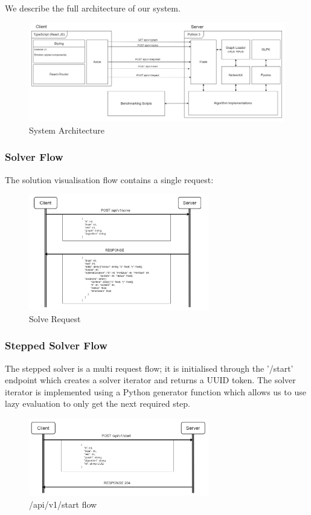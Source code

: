 We describe the full architecture of our system.

\begin{figure}[H]
    \centering
    \includegraphics[width=\textwidth]{images/system_architecture.png}
    \caption{System Architecture}
    \label{fig:system_architecture}
\end{figure}

\subsubsection{Solver Flow}
The solution visualisation flow contains a single request:
\begin{figure}[H]
    \centering
    \includegraphics[width=0.7\textwidth]{images/solver_ui/post_solve_flow.png}
    \caption{Solve Request}
    \label{fig:solve_request}
\end{figure}

\subsubsection{Stepped Solver Flow}
The stepped solver is a multi request flow; it is initialised through the '/start' endpoint which creates a solver iterator and returns a UUID token. The solver iterator is implemented using a Python generator function which allows us to use lazy evaluation to only get the next required step.
\begin{figure}[H]
    \centering
    \includegraphics[width=0.7\textwidth]{images/stepped_solver_ui/start_stepped_flow.png}
    \caption{/api/v1/start flow}
    \label{fig:stepped_start_request}
\end{figure}

